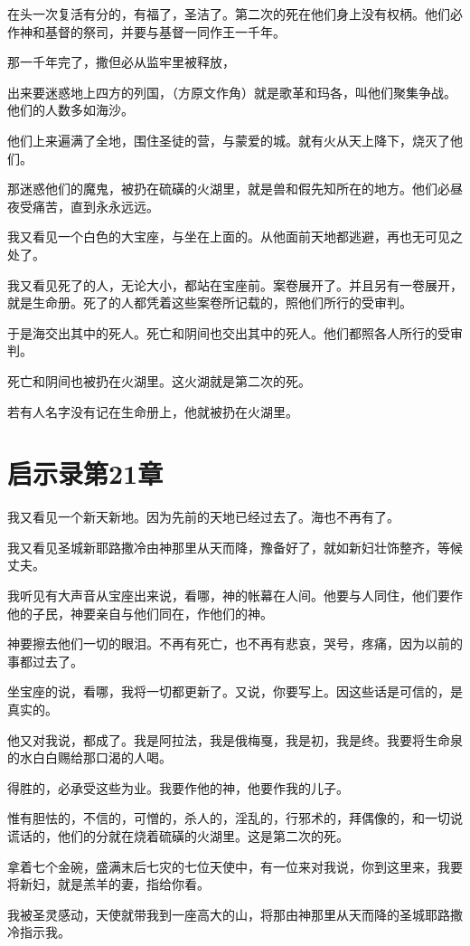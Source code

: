 \documentclass[12pt,oneside]{book}
\begin{document}
在头一次复活有分的，有福了，圣洁了。第二次的死在他们身上没有权柄。他们必作神和基督的祭司，并要与基督一同作王一千年。

那一千年完了，撒但必从监牢里被释放，

出来要迷惑地上四方的列国，（方原文作角）就是歌革和玛各，叫他们聚集争战。他们的人数多如海沙。

他们上来遍满了全地，围住圣徒的营，与蒙爱的城。就有火从天上降下，烧灭了他们。

那迷惑他们的魔鬼，被扔在硫磺的火湖里，就是兽和假先知所在的地方。他们必昼夜受痛苦，直到永永远远。

我又看见一个白色的大宝座，与坐在上面的。从他面前天地都逃避，再也无可见之处了。

我又看见死了的人，无论大小，都站在宝座前。案卷展开了。并且另有一卷展开，就是生命册。死了的人都凭着这些案卷所记载的，照他们所行的受审判。

于是海交出其中的死人。死亡和阴间也交出其中的死人。他们都照各人所行的受审判。

死亡和阴间也被扔在火湖里。这火湖就是第二次的死。

若有人名字没有记在生命册上，他就被扔在火湖里。

\chapter{启示录第21章}
我又看见一个新天新地。因为先前的天地已经过去了。海也不再有了。

我又看见圣城新耶路撒冷由神那里从天而降，豫备好了，就如新妇壮饰整齐，等候丈夫。

我听见有大声音从宝座出来说，看哪，神的帐幕在人间。他要与人同住，他们要作他的子民，神要亲自与他们同在，作他们的神。

神要擦去他们一切的眼泪。不再有死亡，也不再有悲哀，哭号，疼痛，因为以前的事都过去了。

坐宝座的说，看哪，我将一切都更新了。又说，你要写上。因这些话是可信的，是真实的。

他又对我说，都成了。我是阿拉法，我是俄梅戛，我是初，我是终。我要将生命泉的水白白赐给那口渴的人喝。

得胜的，必承受这些为业。我要作他的神，他要作我的儿子。

惟有胆怯的，不信的，可憎的，杀人的，淫乱的，行邪术的，拜偶像的，和一切说谎话的，他们的分就在烧着硫磺的火湖里。这是第二次的死。

拿着七个金碗，盛满末后七灾的七位天使中，有一位来对我说，你到这里来，我要将新妇，就是羔羊的妻，指给你看。

我被圣灵感动，天使就带我到一座高大的山，将那由神那里从天而降的圣城耶路撒冷指示我。
\end{document}
